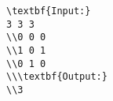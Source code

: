 \begin{verbatim}
\textbf{Input:}
3 3 3
\\0 0 0
\\1 0 1
\\0 1 0
\\\textbf{Output:}
\\3
\end{verbatim}